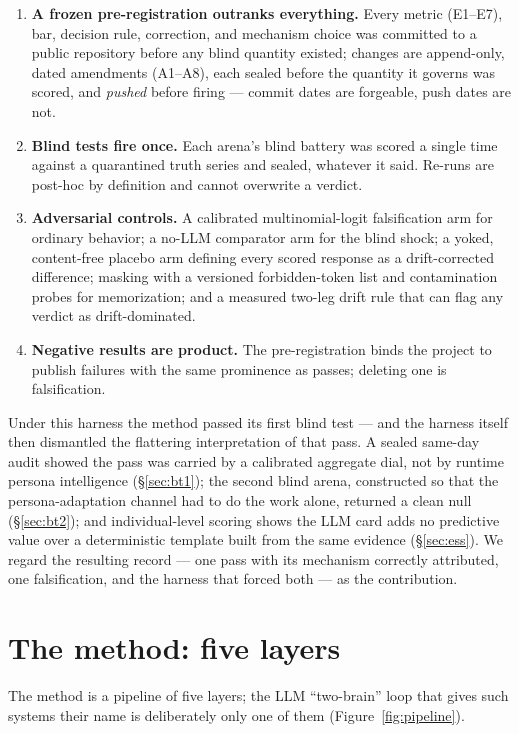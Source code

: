 \documentclass[11pt]{article}
\begin{document}
\begin{enumerate}[leftmargin=1.5em,itemsep=1pt]
\item \textbf{A frozen pre-registration outranks everything.} Every
metric (E1--E7), bar, decision rule, correction, and mechanism choice
was committed to a public repository before any blind quantity existed;
changes are append-only, dated amendments (A1--A8), each sealed before
the quantity it governs was scored, and \emph{pushed} before firing ---
commit dates are forgeable, push dates are not.
\item \textbf{Blind tests fire once.} Each arena's blind battery was
scored a single time against a quarantined truth series and sealed,
whatever it said. Re-runs are post-hoc by definition and cannot
overwrite a verdict.
\item \textbf{Adversarial controls.} A calibrated multinomial-logit
falsification arm for ordinary behavior; a no-LLM comparator arm for
the blind shock; a yoked, content-free placebo arm defining every
scored response as a drift-corrected difference; masking with a
versioned forbidden-token list and contamination probes for
memorization; and a measured two-leg drift rule that can flag any
verdict as drift-dominated.
\item \textbf{Negative results are product.} The pre-registration binds
the project to publish failures with the same prominence as passes;
deleting one is falsification.
\end{enumerate}

Under this harness the method passed its first blind test --- and the
harness itself then dismantled the flattering interpretation of that
pass. A sealed same-day audit showed the pass was carried by a
calibrated aggregate dial, not by runtime persona intelligence
(\S\ref{sec:bt1}); the second blind arena, constructed so that the
persona-adaptation channel had to do the work alone, returned a clean
null (\S\ref{sec:bt2}); and individual-level scoring shows the LLM card
adds no predictive value over a deterministic template built from the
same evidence (\S\ref{sec:ess}). We regard the resulting record --- one
pass with its mechanism correctly attributed, one falsification, and
the harness that forced both --- as the contribution.

\section{The method: five layers}
\label{sec:method}

The method is a pipeline of five layers; the LLM ``two-brain'' loop
that gives such systems their name is deliberately only one of them
(Figure~\ref{fig:pipeline}).
\end{document}
